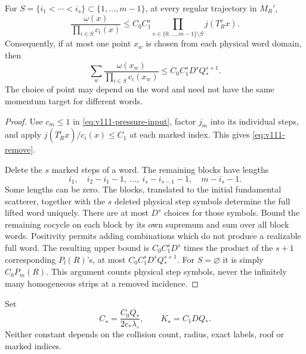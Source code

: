 \begin{lemma}
\label{lem:v111-remove}
For $S=\{i_1<\cdots<i_s\}\subset\{1,\ldots,m-1\}$, at every
regular trajectory in $M_R'$,
\begin{equation}\label{eq:v111-remove}
 \frac{\omega(x)}{\prod_{i\in S}c_i(x)}
   \le C_0C_1^s\prod_{v\in\{0,\ldots,m-1\}\setminus S}j(T_R^vx).
\end{equation}
Consequently, if at most one point $x_w$ is chosen from each
physical word domain, then
\begin{equation}\label{eq:v111-selected-word-sum}
 \sum_w\frac{\omega(x_w)}{\prod_{i\in S}c_i(x_w)}
                 \le C_0C_1^s D^s Q_*^{s+1}.
\end{equation}
The choice of point may depend on the word and need not have the
same momentum target for different words.
\end{lemma}
\begin{proof}
Use $c_m\le1$ in \eqref{eq:v111-pressure-input}, factor $j_m$ into
its individual steps, and apply $j(T_R^ix)/c_i(x)\le C_1$ at each
marked index. This gives \eqref{eq:v111-remove}.

Delete the $s$ marked steps of a word. The remaining blocks have
lengths
\[
 i_1,\quad i_2-i_1-1,\ \ldots,\ i_s-i_{s-1}-1,
                                      \quad m-i_s-1.
\]
Some lengths can be zero. The blocks, translated to the initial
fundamental scatterer, together with the $s$ deleted physical step
symbols determine the full lifted word uniquely. There are at most
$D^s$ choices for those symbols. Bound the remaining cocycle on each
block by its own supremum and sum over all block words. Positivity
permits adding combinations which do not produce a realizable full
word. The resulting upper bound is $C_0C_1^sD^s$ times the product
of the $s+1$ corresponding $P_l(R)$'s, at most
$C_0C_1^sD^sQ_*^{s+1}$. For $S=\varnothing$ it is simply
$C_0P_m(R)$. This argument counts physical step symbols, never the
infinitely many homogeneous strips at a removed incidence.
\end{proof}

Set
\begin{equation}\label{eq:v111-constants}
       C_\star=\frac{C_0Q_*}{2c_*\lambda_\circ},\qquad
       K_\star=C_1DQ_*.
\end{equation}
Neither constant depends on the collision count, radius, exact
labels, roof or marked indices.

